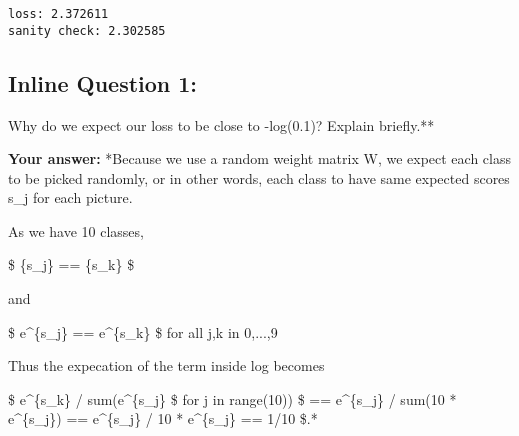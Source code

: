 \documentclass[11pt]{article}
\begin{document}
    \begin{Verbatim}[commandchars=\\\{\}]
loss: 2.372611
sanity check: 2.302585

    \end{Verbatim}

    \subsection{Inline Question 1:}\label{inline-question-1}

Why do we expect our loss to be close to -log(0.1)? Explain briefly.**

\textbf{Your answer:} *Because we use a random weight matrix W, we
expect each class to be picked randomly, or in other words, each class
to have same expected scores s\_j for each picture.

As we have 10 classes,

\$ \{s\_j\} == \{s\_k\} \$

and

\$ e\^{}\{s\_j\} == e\^{}\{s\_k\} \$ for all j,k in 0,...,9

Thus the expecation of the term inside log becomes

\$ e\^{}\{s\_k\} / sum(e\^{}\{s\_j\} \$ for j in range(10)) \$ ==
e\^{}\{s\_j\} / sum(10 * e\^{}\{s\_j\}) == e\^{}\{s\_j\} / 10 *
e\^{}\{s\_j\} == 1/10 \$.*
\end{document}
